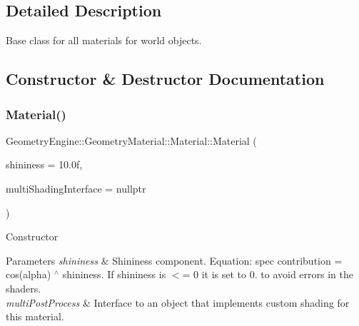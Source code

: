 \subsection{Detailed Description}
Base class for all materials for world objects. 

\subsection{Constructor \& Destructor Documentation}
\mbox{\label{class_geometry_engine_1_1_geometry_material_1_1_material_acd2eb27d61c59aa8811a0536cc882dc5}} 
\subsubsection{\texorpdfstring{Material()}{Material()}\hspace{0.1cm}{\footnotesize\ttfamily [1/2]}}
{\footnotesize\ttfamily Geometry\+Engine\+::\+Geometry\+Material\+::\+Material\+::\+Material (\begin{DoxyParamCaption}\item[{float}]{shininess = {\ttfamily 10.0f},  }\item[{const \mbox{\hyperlink{class_geometry_engine_1_1_custom_shading_1_1_multi_shading_interface}{Custom\+Shading\+::\+Multi\+Shading\+Interface}} $\ast$const}]{multi\+Shading\+Interface = {\ttfamily nullptr} }\end{DoxyParamCaption})}

Constructor 
\begin{DoxyParams}{Parameters}
{\em shininess} & Shininess component. Equation\+: spec contribution = cos(alpha) $^\wedge$ shininess. If shininess is $<$= 0 it is set to 0. to avoid errors in the shaders. \\
\hline
{\em multi\+Post\+Process} & Interface to an object that implements custom shading for this material. \\
\hline
\end{DoxyParams}
\mbox{\label{class_geometry_engine_1_1_geometry_material_1_1_material_a18c3bbd40d6c410c9c8ca9dfc36f15ee}} 
